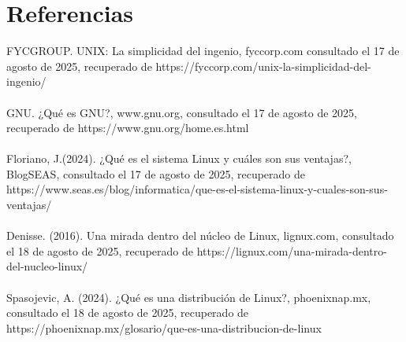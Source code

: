 \documentclass[10pt,a4paper,titlepage]{article}
\begin{document}
	\section*{Referencias}
	FYCGROUP. UNIX: La simplicidad del ingenio, fyccorp.com consultado el 17 de agosto de 2025, recuperado de https://fyccorp.com/unix-la-simplicidad-del-ingenio/	
	\\
	\\
	GNU. ¿Qué es GNU?, www.gnu.org, consultado el 17 de agosto de 2025, recuperado de https://www.gnu.org/home.es.html
	\\
	\\
	Floriano, J.(2024). ¿Qué es el sistema Linux y cuáles son sus ventajas?, BlogSEAS, consultado el 17 de agosto de 2025, recuperado de https://www.seas.es/blog/informatica/que-es-el-sistema-linux-y-cuales-son-sus-ventajas/
	\\
	\\
	Denisse. (2016). Una mirada dentro del núcleo de Linux, lignux.com, consultado el 18 de agosto de 2025, recuperado de https://lignux.com/una-mirada-dentro-del-nucleo-linux/
	\\
	\\
	Spasojevic, A. (2024). ¿Qué es una distribución de Linux?, phoenixnap.mx, consultado el 18 de agosto de 2025, recuperado de https://phoenixnap.mx/glosario/que-es-una-distribucion-de-linux
	
\end{document}
